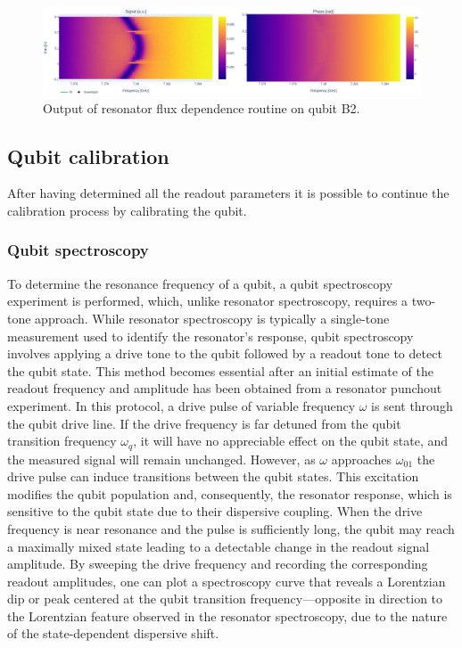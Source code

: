 \begin{figure}[h!]
    \centering
    \includegraphics[width=\textwidth]{figures/png/cute_flux.png}
    \caption{Output of resonator flux dependence routine on qubit B2.}
    \label{fig:res_flux_dep}
\end{figure}

\subsection{Qubit calibration}
After having determined all the readout parameters it is possible to continue the calibration process by calibrating the qubit.

\subsubsection{Qubit spectroscopy}
To determine the resonance frequency of a qubit, a qubit spectroscopy experiment is performed, which, unlike resonator spectroscopy, requires a two-tone approach. 
While resonator spectroscopy is typically a single-tone measurement used to identify the resonator's response, qubit spectroscopy involves applying a drive tone to the qubit followed by a readout tone to detect the qubit state. 
This method becomes essential after an initial estimate of the readout frequency and amplitude has been obtained from a resonator punchout experiment. 
In this protocol, a drive pulse of variable frequency $\omega$ is sent through the qubit drive line. 
If the drive frequency is far detuned from the qubit transition frequency $\omega_{q}$, it will have no appreciable effect on the qubit state, and the measured signal will remain unchanged. 
However, as $\omega$ approaches $\omega_{01}$ the drive pulse can induce transitions between the qubit states. 
This excitation modifies the qubit population and, consequently, the resonator response, which is sensitive to the qubit state due to their dispersive coupling. 
When the drive frequency is near resonance and the pulse is sufficiently long, the qubit may reach a maximally mixed state leading to a detectable change in the readout signal amplitude. 
By sweeping the drive frequency and recording the corresponding readout amplitudes, one can plot a spectroscopy curve that reveals a Lorentzian dip or peak centered at the qubit transition frequency—opposite in direction to the Lorentzian feature observed in the resonator spectroscopy, due to the nature of the state-dependent dispersive shift.

